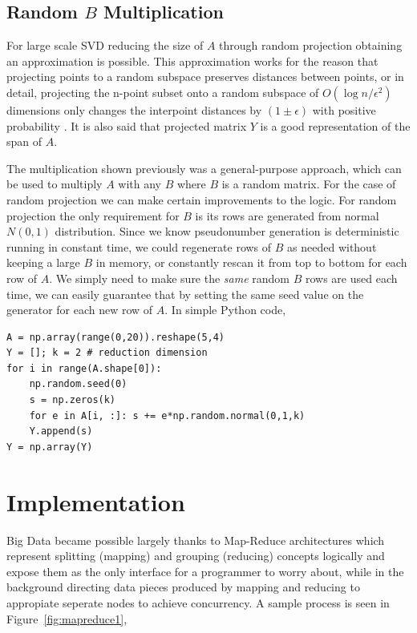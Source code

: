 \documentclass{article}
\begin{document}
\subsection{Random $B$ Multiplication}

For large scale SVD reducing the size of $A$ through random projection obtaining
an approximation is possible. This approximation works for the reason that
projecting points to a random subspace preserves distances between points, or in
detail, projecting the n-point subset onto a random subspace of $O(\log
n/\epsilon^2)$ dimensions only changes the interpoint distances by $(1 \pm
\epsilon)$ with positive probability \cite{gupta}. It is also said that
projected matrix $Y$ is a good representation of the span of $A$.

The multiplication shown previously was a general-purpose approach, which can be
used to multiply $A$ with any $B$ where $B$ is a random matrix. For the case of
random projection we can make certain improvements to the logic. For random
projection the only requirement for $B$ is its rows are generated from normal
$N(0,1)$ distribution. Since we know pseudonumber generation is deterministic
running in constant time, we could regenerate rows of $B$ as needed without
keeping a large $B$ in memory, or constantly rescan it from top to bottom for
each row of $A$. We simply need to make sure the {\em same} random $B$ rows are
used each time, we can easily guarantee that by setting the same seed value on
the generator for each new row of $A$. In simple Python code,

\begin{verbatim}
A = np.array(range(0,20)).reshape(5,4)
Y = []; k = 2 # reduction dimension
for i in range(A.shape[0]):
    np.random.seed(0)
    s = np.zeros(k)
    for e in A[i, :]: s += e*np.random.normal(0,1,k)
    Y.append(s)
Y = np.array(Y)
\end{verbatim}

\section{Implementation}

Big Data became possible largely thanks to Map-Reduce architectures which
represent splitting (mapping) and grouping (reducing) concepts logically and
expose them as the only interface for a programmer to worry about, while in the
background directing data pieces produced by mapping and reducing to appropiate
seperate nodes to achieve concurrency. A sample process is seen in
Figure~\ref{fig:mapreduce1},
\end{document}

